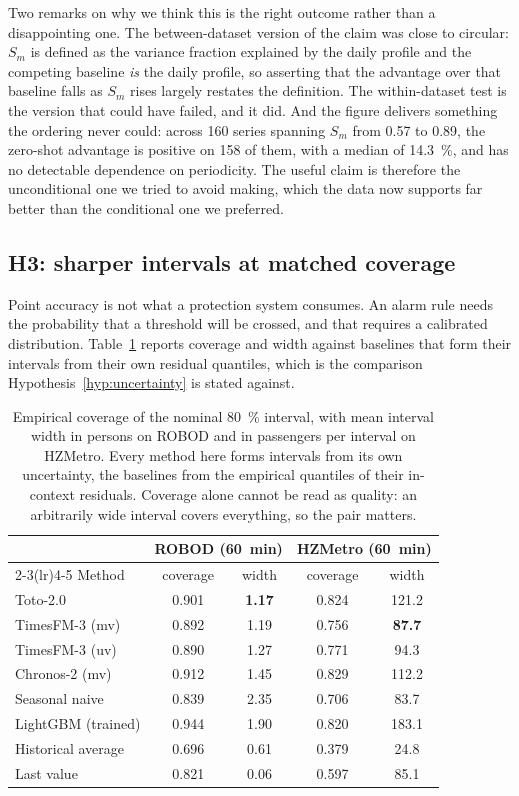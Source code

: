 \documentclass[11pt]{article}
\theoremstyle{plain}
\theoremstyle{definition}
\theoremstyle{remark}
\newcommand{\best}[1]{\textbf{#1}}
\begin{document}
Two remarks on why we think this is the right outcome rather than a disappointing one. The between-dataset version of the claim was close to circular: $S_m$ is defined as the variance fraction explained by the daily profile and the competing baseline \emph{is} the daily profile, so asserting that the advantage over that baseline falls as $S_m$ rises largely restates the definition. The within-dataset test is the version that could have failed, and it did. And the figure delivers something the ordering never could: across \num{160} series spanning $S_m$ from \num{0.57} to \num{0.89}, the zero-shot advantage is positive on \num{158} of them, with a median of \SI{14.3}{\percent}, and has no detectable dependence on periodicity. The useful claim is therefore the unconditional one we tried to avoid making, which the data now supports far better than the conditional one we preferred.

\subsection{H3: sharper intervals at matched coverage}

Point accuracy is not what a protection system consumes. An alarm rule needs the probability that a threshold will be crossed, and that requires a calibrated distribution. Table~\ref{tab:calibration} reports coverage and width against baselines that form their intervals from their own residual quantiles, which is the comparison Hypothesis~\ref{hyp:uncertainty} is stated against.

\begin{table}[htbp]
\centering
\caption{Empirical coverage of the nominal \SI{80}{\percent} interval, with mean interval width in persons on ROBOD and in passengers per interval on HZMetro. Every method here forms intervals from its own uncertainty, the baselines from the empirical quantiles of their in-context residuals. Coverage alone cannot be read as quality: an arbitrarily wide interval covers everything, so the pair matters.}
\label{tab:calibration}
\small
\begin{tabular}{lcccc}
\toprule
& \multicolumn{2}{c}{ROBOD (\SI{60}{\minute})} & \multicolumn{2}{c}{HZMetro (\SI{60}{\minute})} \\
\cmidrule(lr){2-3}\cmidrule(lr){4-5}
Method & coverage & width & coverage & width \\
\midrule
Toto-2.0            & 0.901 & \best{1.17} & 0.824 & 121.2 \\
TimesFM-3 (mv)      & 0.892 & 1.19 & 0.756 & \best{87.7} \\
TimesFM-3 (uv)      & 0.890 & 1.27 & 0.771 & 94.3 \\
Chronos-2 (mv)      & 0.912 & 1.45 & 0.829 & 112.2 \\
\midrule
Seasonal naive      & 0.839 & 2.35 & 0.706 & 83.7 \\
LightGBM (trained)  & 0.944 & 1.90 & 0.820 & 183.1 \\
Historical average  & 0.696 & 0.61 & 0.379 & 24.8 \\
Last value          & 0.821 & 0.06 & 0.597 & 85.1 \\
\bottomrule
\end{tabular}
\end{table}
\end{document}
